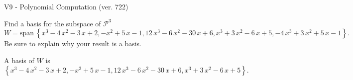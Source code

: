 \begin{exercise}
  \begin{exerciseTitle}V9 - Polynomial Computation (ver. 722)\end{exerciseTitle}
  \begin{exerciseStatement}
    Find a basis for the subspace of \(\mathcal{P}^3\) 
\[W=\mathrm{span}\ \left\{x^{3} - 4 \, x^{2} - 3 \, x + 2 , -x^{2} + 5 \, x - 1 , 12 \, x^{3} - 6 \, x^{2} - 30 \, x + 6 , x^{3} + 3 \, x^{2} - 6 \, x + 5 , -4 \, x^{3} + 3 \, x^{2} + 5 \, x - 1\right\}.\]
 Be sure to explain why your result is a basis.


  \end{exerciseStatement}
  \begin{exerciseAnswer}
   A basis of \(W\) is  \(\left\{x^{3} - 4 \, x^{2} - 3 \, x + 2 , -x^{2} + 5 \, x - 1 , 12 \, x^{3} - 6 \, x^{2} - 30 \, x + 6 , x^{3} + 3 \, x^{2} - 6 \, x + 5\right\}\).
  


  \end{exerciseAnswer}
\end{exercise}